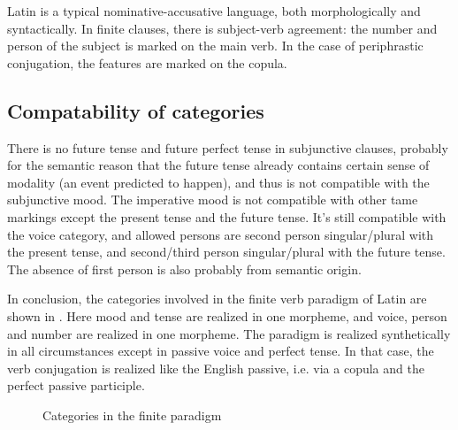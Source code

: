 \documentclass[a4paper, oneside]{report}
\begin{document}
Latin is a typical nominative-accusative language,
both morphologically and syntactically.
In finite clauses, 
there is subject-verb agreement:
the number and person of the subject is marked on the main verb.
In the case of periphrastic conjugation,
the features are marked on the copula.

\subsection{Compatability of categories}

There is no \acl{future} tense and \acl{future perfect} tense in subjunctive clauses,
probably for the semantic reason
that the future tense already contains certain sense of modality
(an event predicted to happen),
and thus is not compatible with the \acl{subjunctive} mood.
The \acl{imperative} mood is not compatible with other \ac{tame} markings
except the \acl{present} tense and the \acl{future} tense.
It's still compatible with the voice category,
and allowed persons are 
second person singular/plural with the \acl{present} tense,
and second/third person singular/plural with the \acl{future} tense.
The absence of first person is also probably from semantic origin.

In conclusion, the categories involved in the finite verb paradigm of Latin 
are shown in .
Here mood and tense are realized in one morpheme,
and voice, person and number are realized in one morpheme.
The paradigm is realized synthetically in all circumstances 
except in passive voice and perfect tense.
In that case, the verb conjugation is realized like the English passive,
i.e. via a copula and the perfect passive participle.

\begin{figure}[H]
    \centering
    
    \caption{Categories in the finite paradigm}
    \label{fig:paradigm-finite-verb}
\end{figure}
\end{document}
